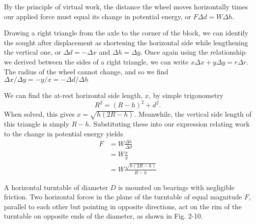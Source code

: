 \documentclass[../feynman-lectures-on-physics.tex]{subfiles}
\begin{document}
\begin{questions}
\begin{solution}
	By the principle of virtual work, the distance the wheel moves horizontally times our applied force must equal its change in potential energy, or $F\Delta{d} = W\Delta{h}$.

	Drawing a right triangle from the axle to the corner of the block, we can identify the sought after displacement as shortening the horizontal side while lengthening the vertical one, or $\Delta{d} = -\Delta{x}$ and $\Delta{h} = \Delta{y}$. Once again using the relationship we derived between the sides of a right triangle, we can write $x\Delta{x} + y\Delta{y} = r\Delta{r}$. The radius of the wheel cannot change, and so we find $\Delta{x}/\Delta{y} = -y/x = -\Delta{d}/\Delta{h}$

	We can find the at-rest horizontal side length, $x$, by simple trigonometry
	\[
	R^2 = (R-h)^2 + d^2
	.\] 
	When solved, this gives $x = \sqrt{h(2R-h)}$. Meanwhile, the vertical side length of this triangle is simply $R - h$. Substituting these into our expression relating work to the change in potential energy yields
	\begin{align}
		F &= W\frac{\Delta{h}}{\Delta{d}} \\
		  &= W\frac{x}{y} \\
		  &= W\frac{\sqrt{h(2R-h)}}{R - h}
	\end{align}
\end{solution}

\question A horizontal turntable of diameter $D$ is mounted on bearings with negligible friction. Two horizontal forces in the plane of the turntable of equal magnitude $F$, parallel to each other but pointing in opposite directions, act on the rim of the turntable on opposite ends of the diameter, as shown in Fig. 2-10.
\end{questions}
\end{document}
